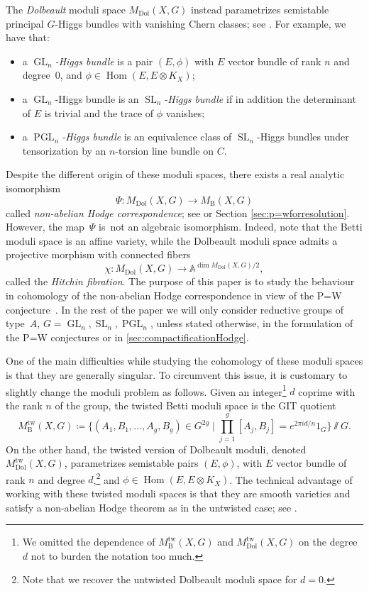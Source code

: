 \documentclass[JEP,XML,SOM,Unicode, NoEqCountersInSection,NoFloatCountersInSection,published]{cedram}
\let\ts\textstyle
\theoremstyle{definition}
\newcommand{\Aff}{\mathbb{A}}
\newcommand{\Gl}{\operatorname{GL}}
\newcommand{\Sl}{\operatorname{SL}}
\newcommand{\PGl}{\operatorname{PGL}}
\newcommand{\Hom}{\operatorname{Hom}}
\newcommand{\mdoltwisted}{M_{\mathrm{Dol}}^{\mathrm{tw}}(X,G)}
\newcommand{\mbtwisted}{M_{\mathrm{B}}^{\mathrm{tw}}(X,G)}
\newcommand{\MDolG}{{M}_{\mathrm{Dol}}(X,G)}
\newcommand{\MBG}{{M}_{\mathrm{B}}(X,G)}
\begin{document}
The \emph{Dolbeault} moduli space $\MDolG$ instead parametrizes semistable principal $G$-Higgs bundles with vanishing Chern classes; see \cite{Simpson1994I}. For example, we have that:
\begin{itemize}
\item a \emph{$\Gl_n$-Higgs bundle} is a pair $(E, \phi)$ with $E$ vector bundle of rank $n$ and degree~$0$, and $\phi \in \Hom(E, E \otimes K_X)$;
\item a $\Gl_n$-Higgs bundle is an \emph{$\Sl_n$-Higgs bundle} if in addition the determinant of $E$ is trivial and the trace of $\phi$ vanishes;
\item a \emph{$\PGl_n$-Higgs bundle} is an equivalence class of $\Sl_n$-Higgs bundles under tensorization by an $n$-torsion line bundle on $C$.
\end{itemize}

Despite the different origin of these moduli spaces, there exists a real analytic isomorphism
\[
\Psi\colon \MDolG \to \MBG
\]
called \emph{non-abelian Hodge correspondence}; see \cite{Simpson1994} or Section \ref{sec:p=wforresolution}. However, the map~$\Psi$ is~not an algebraic isomorphism. Indeed, note that the Betti moduli space is an affine variety, while the Dolbeault moduli space admits a projective morphism with connected fibers
\[
\chi: \MDolG \to \Aff^{\dim\MDolG /2},
\]
called the \emph{Hitchin fibration}. The purpose of this paper is to study the behaviour in cohomology of the non-abelian Hodge correspondence in view of the P=W conjecture~\cite{deCataldoHauselMigliorini2012}. In the rest of the paper we will only consider reductive groups of type~$A$, \ie $G=\Gl_n, \Sl_n, \PGl_n$, unless stated otherwise, \eg in the formulation of the P=W conjectures or in \cref{sec:compactificationHodge}.

One of the main difficulties while studying the cohomology of these moduli spaces is that they are generally singular. To circumvent this issue, it is customary to slightly change the moduli problem as follows. Given an integer\footnote{We omitted the dependence of $\mbtwisted$ and $\mdoltwisted$ on the degree $d$ not to burden the notation too much.} $d$ coprime with the rank $n$ of the group, the twisted Betti moduli space is the GIT quotient
\[
\mbtwisted \coloneqq
\big\{ (A_1, B_1, \ldots, A_{g}, B_{g}) \in G^{2g} \mid \ts \prod^{g}_{j=1}[A_j, B_j]=e^{2\pi id/n}1_{G} \big\}\sslash G.
\]
On the other hand, the twisted version of Dolbeault moduli, denoted $\mdoltwisted$, parametrizes semistable pairs $(E, \phi)$, with $E$ vector bundle of rank $n$ and degree $d$,\footnote{Note that we recover the untwisted Dolbeault moduli space for $d=0$.} and $\phi \in \Hom(E, E \otimes K_X)$. The technical advantage of working with these twisted moduli spaces is that they are smooth varieties and satisfy a non-abelian Hodge theorem as in the untwisted case; see \cite{HauselThaddeus04}.
\end{document}
